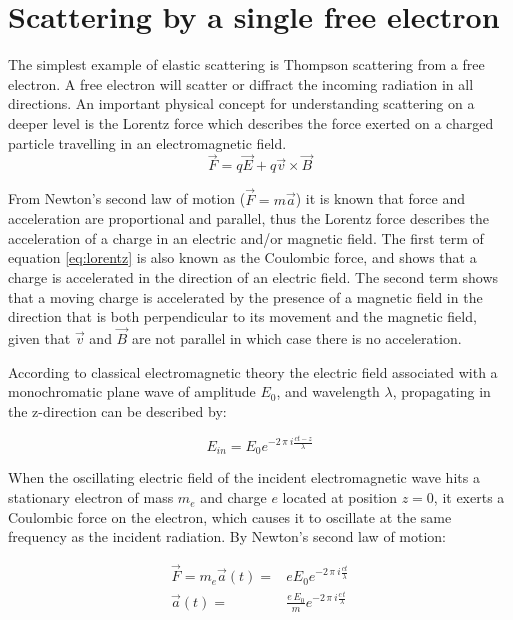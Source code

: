 \section{Scattering by a single free electron}
The simplest example of elastic scattering is Thompson scattering from a free electron. A free electron will scatter or diffract the incoming radiation in all directions. An important physical concept for understanding scattering on a deeper level is the Lorentz force which describes the force exerted on a charged particle travelling in an electromagnetic field. 
\begin{equation}\label{eq:lorentz}
\vec{F} = q\vec{E} + q\vec{v}\times\vec{B}
\end{equation} 

From Newton's second law of motion ($\vec{F} = m \vec{a}$) it is known that force and acceleration are
proportional and parallel, thus the Lorentz force describes the acceleration of a charge in an electric and/or magnetic field. The first term of equation \ref{eq:lorentz} is also known as the Coulombic force, and shows that a charge is accelerated in the direction of an electric field. The second term shows that a moving charge is accelerated by the presence of a magnetic field in the direction that is both perpendicular to its movement and the magnetic field, given that $\vec{v}$ and $\vec{B}$ are not parallel in which case there is no acceleration.

According to classical electromagnetic theory the electric field associated with a monochromatic plane wave of amplitude $E_0$, and wavelength $\lambda$, propagating in the z-direction can be described by: 

\begin{equation}\label{eq:plane_wave}
E_{in} = E_0 e^{-2\,\pi\ i \frac{ c t - z}{\lambda}}
\end{equation} 

When the oscillating electric field of the incident electromagnetic wave hits a stationary electron of mass $m_e$ and charge $e$ located at position $z = 0$, it exerts a Coulombic force on the electron, which causes it to oscillate at the same frequency as the incident radiation. By Newton's second law of motion:

\begin{align}\label{eq:motion_single}
\vec{F} = m_e \vec{a}(t) =& e E_0 e^{-2\,\pi\ i \frac{ c t}{\lambda}} \\
\vec{a}(t) =& \frac{e\,E_0}{m} e^{-2\,\pi\ i \frac{c\,t}{\lambda}}
\end{align}

